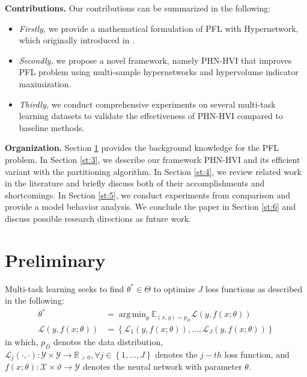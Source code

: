 \documentclass[letterpaper]{article} %
\DeclareMathOperator*{\argmin}{arg\,min}
\newcommand{\ourmodel}{PHN-HVI }
\begin{document}
{\bf Contributions.} Our contributions can be summarized in the following:
\begin{itemize}
    \item \emph{Firstly,} we provide a mathematical formulation of PFL with Hypernetwork, which originally introduced in \cite{navon2021learning}.
    \item \emph{Secondly,} we propose a novel framework, namely \ourmodel that improves PFL problem using multi-sample hypernetworks and hypervolume indicator maximization.
    \item \emph{Thirdly,} we conduct comprehensive experiments on several multi-task learning datasets to validate the effectiveness of \ourmodel compared to baseline methods.   
\end{itemize}

{\bf Organization.} Section \ref{st:2} provides the background knowledge for the PFL problem. In Section \ref{st:3}, we describe our framework \ourmodel and its efficient variant with the partitioning algorithm. In Section \ref{st:4}, we review related work in the literature and briefly discuss both of their accomplishments and shortcomings. In Section \ref{st:5}, we conduct experiments from comparison and provide a model behavior analysis. We conclude the paper in Section \ref{st:6} and discuss possible research directions as future work.

\section{Preliminary}
\label{st:2}
Multi-task learning seeks to find $\theta^* \in \Theta$ to optimize $J$ loss functions as described in the following: 
\begin{align}
    \theta^* &= \argmin_{\theta} \mathbb{E}_{(x, y) \sim p_D} \mathcal{L}\left(y, f\left(x; \theta \right)\right)\\
    \mathcal{L}\left(y, f\left(x; \theta \right)\right) &=\left\{ \mathcal{L}_1\left(y, f\left(x; \theta \right)\right),  
    \nonumber
    \dots,  
     \mathcal{L}_J\left(y, f\left(x; \theta \right)\right) \right\}
\end{align}
in which, $p_D$ denotes the data distribution,  $\mathcal{L}_j\left(\cdot, \cdot \right):
\mathcal{Y} \times \mathcal{Y} \rightarrow \mathbb{R}_{>0}, \forall j \in 
\left\{1, \dots, J\right\}$ denotes the $j-th$ loss function, and $f\left(x; \theta \right): \mathcal{X} \times \vartheta \rightarrow \mathcal{Y}$ denotes the neural network with parameter $\theta$.
\end{document}
